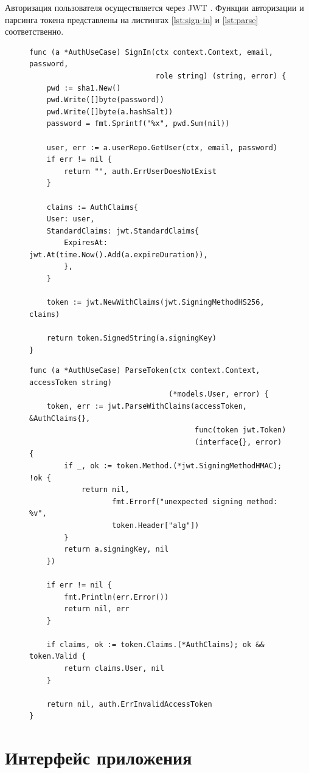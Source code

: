 Авторизация пользователя осуществляется через JWT \cite{JWT}. Функции авторизации и парсинга токена представлены на листингах \ref{lst:sign-in} и \ref{lst:parse} соответственно.

\begin{figure}[H]
	\begin{lstlisting}[label=lst:sign-in,caption=Функция авторизации пользователя]
func (a *AuthUseCase) SignIn(ctx context.Context, email, password, 
							 role string) (string, error) {
	pwd := sha1.New()
	pwd.Write([]byte(password))
	pwd.Write([]byte(a.hashSalt))
	password = fmt.Sprintf("%x", pwd.Sum(nil))

	user, err := a.userRepo.GetUser(ctx, email, password)
	if err != nil {
		return "", auth.ErrUserDoesNotExist
	}

	claims := AuthClaims{
	User: user,
	StandardClaims: jwt.StandardClaims{
		ExpiresAt: jwt.At(time.Now().Add(a.expireDuration)),
		},
	}

	token := jwt.NewWithClaims(jwt.SigningMethodHS256, claims)
	
	return token.SignedString(a.signingKey)
}
\end{lstlisting}
\end{figure}

\begin{figure}[H]
\begin{lstlisting}[label=lst:parse,caption=Функция парсинга токена]	
func (a *AuthUseCase) ParseToken(ctx context.Context, accessToken string) 
								(*models.User, error) {
	token, err := jwt.ParseWithClaims(accessToken, &AuthClaims{}, 
									  func(token jwt.Token) 
									  (interface{}, error) {
		if _, ok := token.Method.(*jwt.SigningMethodHMAC); !ok {
			return nil, 
				   fmt.Errorf("unexpected signing method: %v", 
				   token.Header["alg"])
		}
		return a.signingKey, nil
	})

	if err != nil {
		fmt.Println(err.Error())
		return nil, err
	}

	if claims, ok := token.Claims.(*AuthClaims); ok && token.Valid {
		return claims.User, nil
	}

	return nil, auth.ErrInvalidAccessToken
}
	\end{lstlisting}
\end{figure}

\section{Интерфейс приложения}

